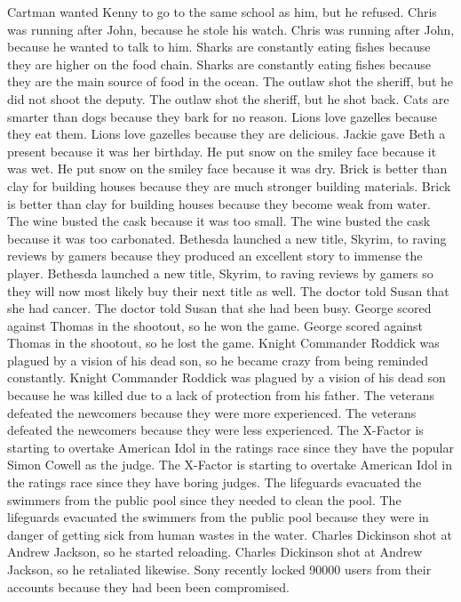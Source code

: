 \documentclass{article}
\begin{document}
\begin{enumerate}
Cartman wanted Kenny to go to the same school as him, but he refused.
Chris was running after John, because he stole his watch.
Chris was running after John, because he wanted to talk to him.
Sharks are constantly eating fishes because they are higher on the food chain.
Sharks are constantly eating fishes because they are the main source of food in the ocean.
The outlaw shot the sheriff, but he did not shoot the deputy.
The outlaw shot the sheriff, but he shot back.
Cats are smarter than dogs because they bark for no reason.
Lions love gazelles because they eat them.
Lions love gazelles because they are delicious.
Jackie gave Beth a present because it was her birthday.
He put snow on the smiley face because it was wet.
He put snow on the smiley face because it was dry.
Brick is better than clay for building houses because they are much stronger building materials.
Brick is better than clay for building houses because they become weak from water.
The wine busted the cask because it was too small.
The wine busted the cask because it was too carbonated.
Bethesda launched a new title, Skyrim, to raving reviews by gamers because they produced an excellent story to immense the player.
Bethesda launched a new title, Skyrim, to raving reviews by gamers so they will now most likely buy their next title as well.
The doctor told Susan that she had cancer.
The doctor told Susan that she had been busy.
George scored against Thomas in the shootout, so he won the game.
George scored against Thomas in the shootout, so he lost the game.
Knight Commander Roddick was plagued by a vision of his dead son, so he became crazy from being reminded constantly.
Knight Commander Roddick was plagued by a vision of his dead son because he was killed due to a lack of protection from his father.
The veterans defeated the newcomers because they were more experienced.
The veterans defeated the newcomers because they were less experienced.
The X-Factor is starting to overtake American Idol in the ratings race since they have the popular Simon Cowell as the judge.
The X-Factor is starting to overtake American Idol in the ratings race since they have boring judges.
The lifeguards evacuated the swimmers from the public pool since they needed to clean the pool.
The lifeguards evacuated the swimmers from the public pool because they were in danger of getting sick from human wastes in the water.
Charles Dickinson shot at Andrew Jackson, so he started reloading.
Charles Dickinson shot at Andrew Jackson, so he retaliated likewise.
Sony recently locked 90000 users from their accounts because they had been been compromised.

\end{enumerate}
\end{document}

